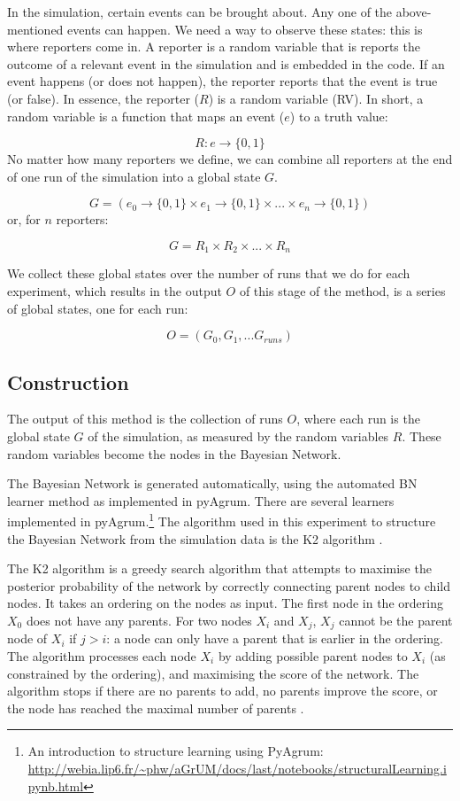 \documentclass[12pt]{article}
\begin{document}
In the simulation, certain events can be brought about. Any one of the above-mentioned events can happen. We need a way to observe these states: this is where reporters come in. A reporter is a random variable that is reports the outcome of a relevant event in the simulation and is embedded in the code. If an event happens (or does not happen), the reporter reports that the event is true (or false). In essence, the reporter ($R$) is a random variable (RV). In short, a random variable is a function that maps an event ($e$) to a truth value:

\[ R : e \rightarrow \{0, 1\} \]
No matter how many reporters we define, we can combine all reporters at the end of one run of the simulation into a global state $G$.

\[ G = (e_0 \rightarrow \{0, 1\} \times e_1 \rightarrow \{0, 1\} \times ... \times e_n \rightarrow \{0, 1\})\]
 or, for $n$ reporters:
 
\[ G = R_1 \times R_2 \times... \times R_n\]

We collect these global states over the number of runs that we do for each experiment, which results in the output $O$ of this stage of the method, is a series of global states, one for each run:

\[ O = (G_0, G_1, ... G_{runs})\]


\subsection{Construction}
The output of this method is the collection of runs $O$, where each run is the global state $G$ of the simulation, as measured by the random variables $R$. These random variables become the nodes in the Bayesian Network.

The Bayesian Network is generated automatically, using the automated BN learner method as implemented in pyAgrum. There are several learners implemented in pyAgrum.\footnote{An introduction to structure learning using PyAgrum: \url{http://webia.lip6.fr/~phw/aGrUM/docs/last/notebooks/structuralLearning.ipynb.html}} The algorithm used in this experiment to structure the Bayesian Network from the simulation data is the K2 algorithm \citep{Cooper1992}. 

The K2 algorithm is a greedy search algorithm that attempts to maximise the posterior probability of the network by correctly connecting parent nodes to child nodes. It takes an ordering on the nodes as input. The first node in the ordering $X_0$ does not have any parents. For two nodes $X_i$ and $X_j$, $X_j$ cannot be the parent node of $X_i$ if $j > i$: a node can only have a parent that is earlier in the ordering. The algorithm processes each node $X_i$ by adding possible parent nodes to $X_i$ (as constrained by the ordering), and maximising the score of the network. The algorithm stops if there are no parents to add, no parents improve the score, or the node has reached the maximal number of parents \citep{Chen2008}.
\end{document}
